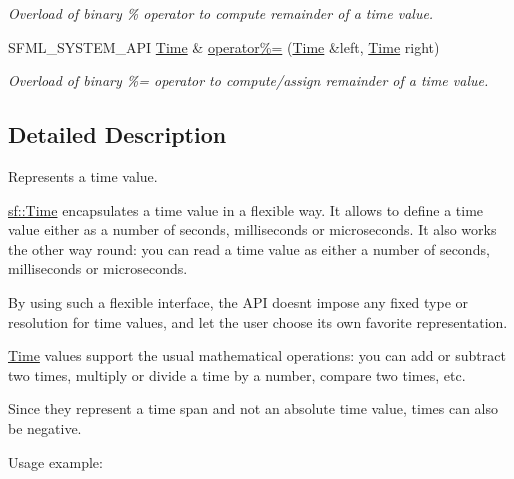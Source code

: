\begin{DoxyCompactItemize}
\begin{DoxyCompactList}\small\item\em Overload of binary \% operator to compute remainder of a time value. \end{DoxyCompactList}\item 
S\+F\+M\+L\+\_\+\+S\+Y\+S\+T\+E\+M\+\_\+\+A\+PI \mbox{\hyperlink{classsf_1_1_time}{Time}} \& \mbox{\hyperlink{classsf_1_1_time_af12dd271f14a17b58c9d737395e776d4}{operator\%=}} (\mbox{\hyperlink{classsf_1_1_time}{Time}} \&left, \mbox{\hyperlink{classsf_1_1_time}{Time}} right)
\begin{DoxyCompactList}\small\item\em Overload of binary \%= operator to compute/assign remainder of a time value. \end{DoxyCompactList}\end{DoxyCompactItemize}


\subsection{Detailed Description}
Represents a time value. 

\begin{DoxyVerb}\end{DoxyVerb}


\mbox{\hyperlink{classsf_1_1_time}{sf\+::\+Time}} encapsulates a time value in a flexible way. It allows to define a time value either as a number of seconds, milliseconds or microseconds. It also works the other way round\+: you can read a time value as either a number of seconds, milliseconds or microseconds.

By using such a flexible interface, the A\+PI doesn\textquotesingle{}t impose any fixed type or resolution for time values, and let the user choose its own favorite representation.

\mbox{\hyperlink{classsf_1_1_time}{Time}} values support the usual mathematical operations\+: you can add or subtract two times, multiply or divide a time by a number, compare two times, etc.

Since they represent a time span and not an absolute time value, times can also be negative.

Usage example\+: 
\begin{DoxyCode}{0}
\DoxyCodeLine{}
\DoxyCodeLine{}
\end{DoxyCode}



